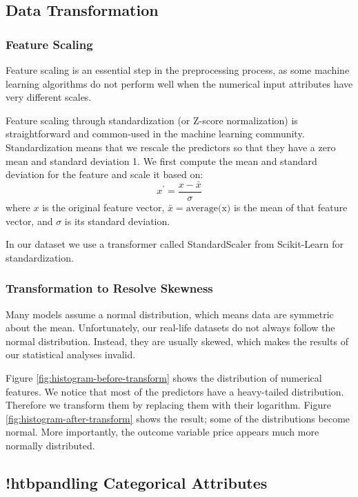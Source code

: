 \subsection{Data Transformation}

\subsubsection*{Feature Scaling}

Feature scaling is an essential step in the preprocessing process, as some
machine learning algorithms do not perform well when the numerical input
attributes have very different scales.

Feature scaling through standardization (or Z-score normalization) is straightforward and
common-used in the machine learning community.
Standardization means that we rescale the predictors so that they have a zero
mean and standard deviation 1.  We first compute the mean and standard deviation
for the feature and scale it based on:
\[x^{'} = \frac{x - \bar{x}}{\sigma}\]
where $x$ is the original feature vector, $\bar{x} = \textrm{average(x)}$ is the mean of
that feature vector, and $\sigma$ is its standard deviation.

\noindent In our dataset we use  a transformer called StandardScaler from Scikit-Learn for
standardization.

\subsubsection*{Transformation to Resolve Skewness}

Many models assume a normal distribution, which means data are symmetric about
the mean.
Unfortunately, our real-life datasets do not always follow the normal
distribution.  Instead, they are usually skewed, which makes the results of our
statistical analyses invalid.

Figure \ref{fig:histogram-before-transform}
shows the distribution of numerical features. We notice
that most of the predictors have a heavy-tailed distribution. Therefore we
transform them by replacing them with their logarithm. Figure
\ref{fig:histogram-after-transform} shows the result;
some of the distributions become normal. More importantly, the outcome variable
price appears much more normally distributed.

\subsection{!htbpandling Categorical Attributes}

